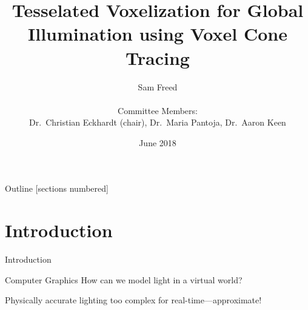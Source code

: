 \documentclass[10pt]{beamer}
\title{Tesselated Voxelization for Global Illumination using Voxel Cone Tracing}
\date{June 2018}
\author{Sam Freed\\\\Committee Members:\\ Dr.\ Christian Eckhardt (chair), Dr.\ Maria Pantoja, Dr.\ Aaron Keen\\}
\institute{California Polytechnic State University, San Luis Obispo}
\begin{document}
\frame{\titlepage}

\begin{frame}{Outline}
  [sections numbered]
  \tableofcontents[hideallsubsections]
\end{frame}


\section{Introduction}

\begin{frame}{Introduction}

  \begin{block}{Computer Graphics}
    How can we model light in a virtual world?

    Physically accurate lighting too complex for real-time---approximate!
  \end{block}
\end{frame}
\end{document}
